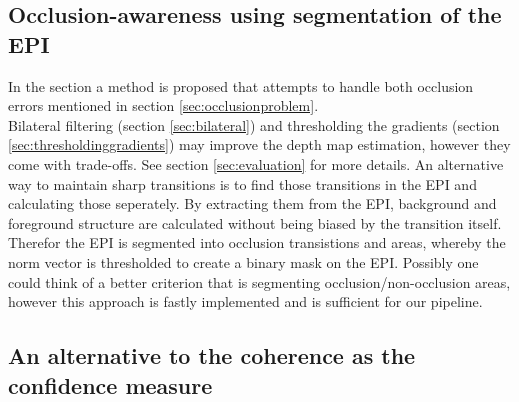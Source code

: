 \documentclass  [
  paper    = a4,
  BCOR     = 10mm,
  twoside,
  fontsize = 12pt,
  fleqn,
  toc      = bibnumbered,
  toc      = listofnumbered,
  numbers  = noendperiod,
  headings = normal,
  listof   = leveldown,
  version  = 3.03
]                                       {scrreprt}
\begin{document}
 \subsection{Occlusion-awareness using segmentation of the EPI}
 In the section a method is proposed that attempts to handle both occlusion errors mentioned in section \ref{sec:occlusionproblem}.\\
 Bilateral filtering (section \ref{sec:bilateral}) and thresholding the gradients (section \ref{sec:thresholdinggradients}) may improve the depth map estimation, however they come with trade-offs. See section \ref{sec:evaluation} for more details. An alternative way to maintain sharp transitions is to find those transitions in the EPI and calculating those seperately. By extracting them from the EPI, background and foreground structure are calculated without being biased by the transition itself. Therefor the EPI is segmented into occlusion transistions and areas, whereby the norm vector is thresholded to create a binary mask on the EPI. Possibly one could think of a better criterion that is segmenting occlusion/non-occlusion areas, however this approach is fastly implemented and is sufficient for our pipeline.
 \subsection{An alternative to the coherence as the confidence measure}
\end{document}
